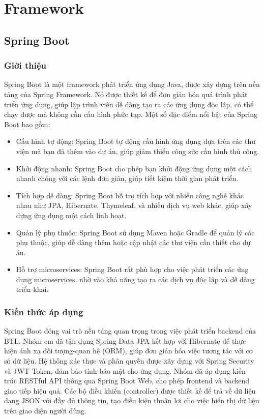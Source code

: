 \documentclass[../BTL.tex]{subfiles}
\begin{document}
\section{Framework}
\subsection{Spring Boot}
\subsubsection{ Giới thiệu}
Spring Boot là một framework phát triển ứng dụng Java, được xây dựng trên nền tảng của Spring Framework. Nó được thiết kế để đơn giản hóa quá trình phát triển ứng dụng, giúp lập trình viên dễ dàng tạo ra các ứng dụng độc lập, có thể chạy được mà không cần cấu hình phức tạp. Một số đặc điểm nổi bật của Spring Boot bao gồm:

\begin{itemize}
    \item Cấu hình tự động: Spring Boot tự động cấu hình ứng dụng dựa trên các thư viện mà bạn đã thêm vào dự án, giúp giảm thiểu công sức cấu hình thủ công.
    \item Khởi động nhanh: Spring Boot cho phép bạn khởi động ứng dụng một cách nhanh chóng với các lệnh đơn giản, giúp tiết kiệm thời gian phát triển.
    \item Tích hợp dễ dàng: Spring Boot hỗ trợ tích hợp với nhiều công nghệ khác nhau như JPA, Hibernate, Thymeleaf, và nhiều dịch vụ web khác, giúp xây dựng ứng dụng một cách linh hoạt.
    \item Quản lý phụ thuộc: Spring Boot sử dụng Maven hoặc Gradle để quản lý các phụ thuộc, giúp dễ dàng thêm hoặc cập nhật các thư viện cần thiết cho dự án.
    \item Hỗ trợ microservices: Spring Boot rất phù hợp cho việc phát triển các ứng dụng microservices, nhờ vào khả năng tạo ra các dịch vụ độc lập và dễ dàng triển khai.
\end{itemize}
\subsubsection{ Kiến thức áp dụng}
Spring Boot đóng vai trò nền tảng quan trọng trong việc phát triển backend của BTL. Nhóm em đã tận dụng Spring Data JPA kết hợp với Hibernate để thực hiện ánh xạ đối tượng-quan hệ (ORM), giúp đơn giản hóa việc tương tác với cơ sở dữ liệu. Hệ thống xác thực và phân quyền được xây dựng với Spring Security và JWT Token, đảm bảo tính bảo mật cho ứng dụng. Nhóm đã áp dụng kiến trúc RESTful API thông qua Spring Boot Web, cho phép frontend và backend giao tiếp hiệu quả. Các bộ điều khiển (controller) được thiết kế để trả về dữ liệu dạng JSON với đầy đủ thông tin, tạo điều kiện thuận lợi cho việc hiển thị dữ liệu trên giao diện người dùng.
\end{document}
